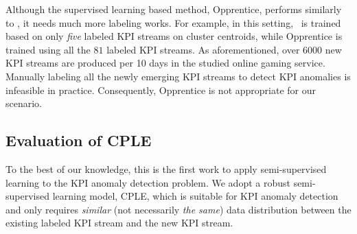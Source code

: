 



Although the supervised learning based method, Opprentice, performs similarly to \name, it needs much more labeling works.
For example, in this setting, \name~is trained based on only \emph{five} labeled KPI streams on cluster centroids, while Opprentice is trained using all the $81$ labeled KPI streams.
As aforementioned, over 6000 new KPI streams are produced per 10 days in the studied online gaming service. 
Manually labeling all the newly emerging KPI streams to detect KPI anomalies is infeasible in practice.
Consequently, Opprentice is not appropriate for our scenario. 


\subsection{Evaluation of CPLE}
\label{subsec:effects_of_techniques}
To the best of our knowledge, this is the first work to apply semi-supervised learning to the KPI anomaly detection problem. 
We adopt a robust semi-supervised learning model, CPLE, which is suitable for KPI anomaly detection and only requires \textit{similar} (not necessarily \textit{the same}) data distribution between the existing labeled KPI stream and the new KPI stream. 

